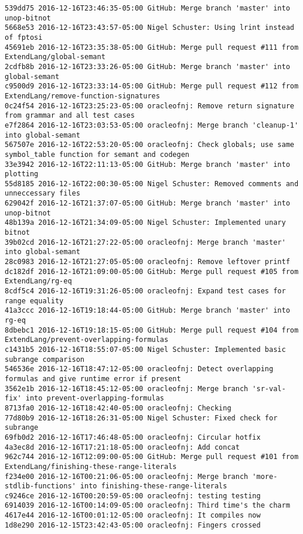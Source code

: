 \begin{lstlisting}
539dd75 2016-12-16T23:46:35-05:00 GitHub: Merge branch 'master' into unop-bitnot
5668e53 2016-12-16T23:43:57-05:00 Nigel Schuster: Using lrint instead of fptosi
45691eb 2016-12-16T23:35:38-05:00 GitHub: Merge pull request #111 from ExtendLang/global-semant
2cdfb8b 2016-12-16T23:33:26-05:00 GitHub: Merge branch 'master' into global-semant
c9500d9 2016-12-16T23:33:14-05:00 GitHub: Merge pull request #112 from ExtendLang/remove-function-signatures
0c24f54 2016-12-16T23:25:23-05:00 oracleofnj: Remove return signature from grammar and all test cases
e7f2864 2016-12-16T23:03:53-05:00 oracleofnj: Merge branch 'cleanup-1' into global-semant
567507e 2016-12-16T22:53:20-05:00 oracleofnj: Check globals; use same symbol_table function for semant and codegen
33e3942 2016-12-16T22:11:13-05:00 GitHub: Merge branch 'master' into plotting
55d8185 2016-12-16T22:00:30-05:00 Nigel Schuster: Removed comments and unneccessary files
629042f 2016-12-16T21:37:07-05:00 GitHub: Merge branch 'master' into unop-bitnot
48b139a 2016-12-16T21:34:09-05:00 Nigel Schuster: Implemented unary bitnot
39b02cd 2016-12-16T21:27:22-05:00 oracleofnj: Merge branch 'master' into global-semant
28c0983 2016-12-16T21:27:05-05:00 oracleofnj: Remove leftover printf
dc182df 2016-12-16T21:09:00-05:00 GitHub: Merge pull request #105 from ExtendLang/rg-eq
8cdf5c4 2016-12-16T19:31:26-05:00 oracleofnj: Expand test cases for range equality
41a3ccc 2016-12-16T19:18:44-05:00 GitHub: Merge branch 'master' into rg-eq
8dbebc1 2016-12-16T19:18:15-05:00 GitHub: Merge pull request #104 from ExtendLang/prevent-overlapping-formulas
c1431b5 2016-12-16T18:55:07-05:00 Nigel Schuster: Implemented basic subrange comparison
546536e 2016-12-16T18:47:12-05:00 oracleofnj: Detect overlapping formulas and give runtime error if present
3562e1b 2016-12-16T18:45:12-05:00 oracleofnj: Merge branch 'sr-val-fix' into prevent-overlapping-formulas
8713fa0 2016-12-16T18:42:40-05:00 oracleofnj: Checking
77d80b9 2016-12-16T18:26:31-05:00 Nigel Schuster: Fixed check for subrange
69fb0d2 2016-12-16T17:46:48-05:00 oracleofnj: Circular hotfix
4a3ec8d 2016-12-16T17:21:18-05:00 oracleofnj: Add concat
962c744 2016-12-16T12:09:00-05:00 GitHub: Merge pull request #101 from ExtendLang/finishing-these-range-literals
f234e00 2016-12-16T00:21:06-05:00 oracleofnj: Merge branch 'more-stdlib-functions' into finishing-these-range-literals
c9246ce 2016-12-16T00:20:59-05:00 oracleofnj: testing testing
6914039 2016-12-16T00:14:09-05:00 oracleofnj: Third time's the charm
4617e44 2016-12-16T00:01:12-05:00 oracleofnj: It compiles now
1d8e290 2016-12-15T23:42:43-05:00 oracleofnj: Fingers crossed

\end{lstlisting}
